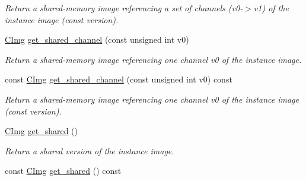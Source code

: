 \begin{DoxyCompactItemize}
\begin{DoxyCompactList}\small\item\em Return a shared-\/memory image referencing a set of channels (v0-\/$>$v1) of the instance image (const version). \end{DoxyCompactList}\item 
\hypertarget{structcimg__library_1_1_c_img_a46c5055f274da78be826242e8f704628}{\hyperlink{structcimg__library_1_1_c_img}{C\-Img} \hyperlink{structcimg__library_1_1_c_img_a46c5055f274da78be826242e8f704628}{get\-\_\-shared\-\_\-channel} (const unsigned int v0)}\label{structcimg__library_1_1_c_img_a46c5055f274da78be826242e8f704628}

\begin{DoxyCompactList}\small\item\em Return a shared-\/memory image referencing one channel v0 of the instance image. \end{DoxyCompactList}\item 
\hypertarget{structcimg__library_1_1_c_img_a805e0c08d300c92cbe4dbc4b90259de7}{const \hyperlink{structcimg__library_1_1_c_img}{C\-Img} \hyperlink{structcimg__library_1_1_c_img_a805e0c08d300c92cbe4dbc4b90259de7}{get\-\_\-shared\-\_\-channel} (const unsigned int v0) const }\label{structcimg__library_1_1_c_img_a805e0c08d300c92cbe4dbc4b90259de7}

\begin{DoxyCompactList}\small\item\em Return a shared-\/memory image referencing one channel v0 of the instance image (const version). \end{DoxyCompactList}\item 
\hypertarget{structcimg__library_1_1_c_img_a9263118438e14cd176f1ac2c75fd4964}{\hyperlink{structcimg__library_1_1_c_img}{C\-Img} \hyperlink{structcimg__library_1_1_c_img_a9263118438e14cd176f1ac2c75fd4964}{get\-\_\-shared} ()}\label{structcimg__library_1_1_c_img_a9263118438e14cd176f1ac2c75fd4964}

\begin{DoxyCompactList}\small\item\em Return a shared version of the instance image. \end{DoxyCompactList}\item 
\hypertarget{structcimg__library_1_1_c_img_a804619d396b0673efdfe73e89b8fedc5}{const \hyperlink{structcimg__library_1_1_c_img}{C\-Img} \hyperlink{structcimg__library_1_1_c_img_a804619d396b0673efdfe73e89b8fedc5}{get\-\_\-shared} () const }\label{structcimg__library_1_1_c_img_a804619d396b0673efdfe73e89b8fedc5}


\end{DoxyCompactItemize}
